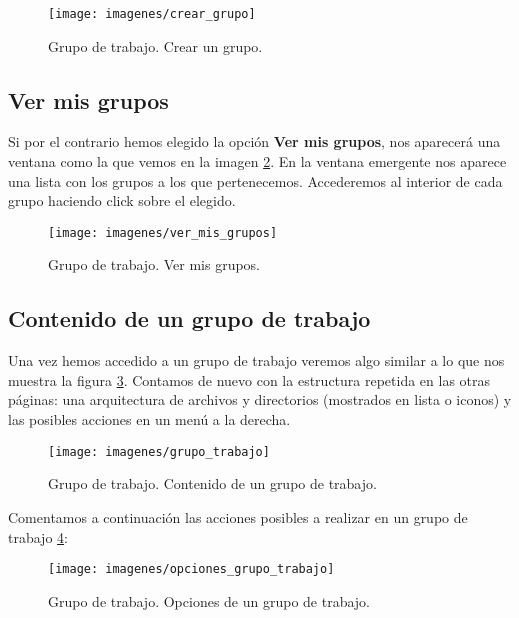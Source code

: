 \begin{figure}[H]
	\centering
	\texttt{[image: imagenes/crear\_grupo]}
	\caption{Grupo de trabajo. Crear un grupo.}
	\label{fig:crear_grupo}
\end{figure}

\subsection{Ver mis grupos}
Si por el contrario hemos elegido la opción \textbf{Ver mis grupos}, nos aparecerá una ventana como la que vemos en la imagen \ref{fig:ver_mis_grupos}. En la ventana emergente nos aparece una lista con los grupos a los que pertenecemos. Accederemos al interior de cada grupo haciendo click sobre el elegido.

\begin{figure}[H]
	\centering
	\texttt{[image: imagenes/ver\_mis\_grupos]}
	\caption{Grupo de trabajo. Ver mis grupos.}
	\label{fig:ver_mis_grupos}
\end{figure}


\subsection{Contenido de un grupo de trabajo}
Una vez hemos accedido a un grupo de trabajo veremos algo similar a lo que nos muestra la figura \ref{fig:grupo_trabajo}. Contamos de nuevo con la estructura repetida en las otras páginas: una arquitectura de archivos y directorios (mostrados en lista o iconos) y las posibles acciones en un menú a la derecha.

\begin{figure}[H]
	\centering
	\texttt{[image: imagenes/grupo\_trabajo]}
	\caption{Grupo de trabajo. Contenido de un grupo de trabajo.}
	\label{fig:grupo_trabajo}
\end{figure}

Comentamos a continuación las acciones posibles a realizar en un grupo de trabajo \ref{fig:opciones_grupo_trabajo}:

\begin{figure}[H]
	\centering
	\texttt{[image: imagenes/opciones\_grupo\_trabajo]}
	\caption{Grupo de trabajo. Opciones de un grupo de trabajo.}
	\label{fig:opciones_grupo_trabajo}
\end{figure}

